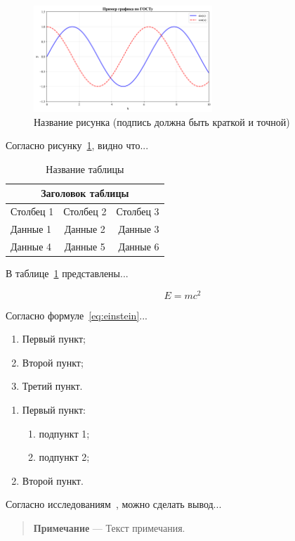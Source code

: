 
\begin{figure}[H]
\centering
\includegraphics[width=0.6\textwidth]{images/example_plot.png}
\caption{Название рисунка (подпись должна быть краткой и точной)}
\label{fig:example}
\end{figure}

Согласно рисунку~\ref{fig:example}, видно что...

\begin{table}[H]
\centering
\caption{Название таблицы}
\begin{tabular}{|l|c|r|}
\hline
\multicolumn{3}{|c|}{\textbf{Заголовок таблицы}} \\
\hline
Столбец 1 & Столбец 2 & Столбец 3 \\
\hline
Данные 1 & Данные 2 & Данные 3 \\
Данные 4 & Данные 5 & Данные 6 \\
\hline
\end{tabular}
\label{tab:example}
\end{table}

В таблице~\ref{tab:example} представлены...

\begin{equation}
E = mc^2
\label{eq:einstein}
\end{equation}

Согласно формуле~\ref{eq:einstein}...

\begin{enumerate}
    \item Первый пункт;
    \item Второй пункт;
    \item Третий пункт.
\end{enumerate}

\begin{enumerate}
    \item Первый пункт:
    \begin{enumerate}
        \item подпункт 1;
        \item подпункт 2;
    \end{enumerate}
    \item Второй пункт.
\end{enumerate}

Согласно исследованиям~\cite{example_book}, можно сделать вывод...

\begin{quote}
\textbf{Примечание} --- Текст примечания.
\end{quote}
